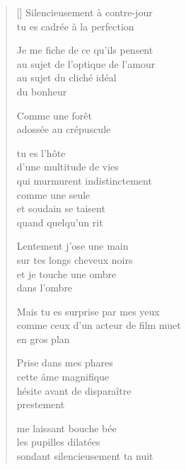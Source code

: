 \documentclass[12pt,a4paper]{article}
\begin{document}
\begin{verse}[\versewidth]
  Silencieusement à contre-jour \\
  tu es cadrée à la perfection

  Je me fiche de ce qu'ils pensent \\
  au sujet de l'optique de l'amour \\
  au sujet du cliché idéal \\
  du bonheur

  Comme une forêt \\
  adossée au crépuscule

  tu es l'hôte \\
  d'une multitude de vies \\
  qui murmurent indistinctement \\
  comme une seule \\
  et soudain se taisent \\
  quand quelqu'un rit

  Lentement j'ose une main \\
  sur tes longs cheveux noirs \\
  et je touche une ombre \\
  dans l'ombre

  Mais tu es surprise par mes yeux \\
  comme ceux d'un acteur de film muet \\
  en gros plan

  Prise dans mes phares \\
  cette âme magnifique \\
  hésite avant de disparaître \\
  prestement

  me laissant bouche bée \\

  les pupilles dilatées \\
  sondant silencieusement ta nuit
\end{verse}
\end{document}
